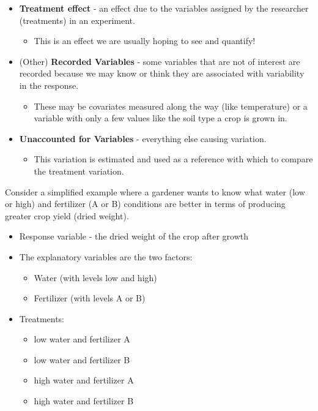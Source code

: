 \documentclass[
]{book}
\providecommand{\tightlist}{%
  \setlength{\itemsep}{0pt}\setlength{\parskip}{0pt}}
\theoremstyle{definition}
\theoremstyle{definition}
\theoremstyle{definition}
\theoremstyle{remark}
\begin{document}
\begin{itemize}
\item
  \textbf{Treatment effect} - an effect due to the variables assigned by the researcher (treatments) in an experiment.

  \begin{itemize}
  \tightlist
  \item
    This is an effect we are usually hoping to see and quantify!
  \end{itemize}
\item
  (Other) \textbf{Recorded Variables} - some variables that are not of interest are recorded because we may know or think they are associated with variability in the response.

  \begin{itemize}
  \tightlist
  \item
    These may be covariates measured along the way (like temperature) or a variable with only a few values like the soil type a crop is grown in.
  \end{itemize}
\item
  \textbf{Unaccounted for Variables} - everything else causing variation.

  \begin{itemize}
  \tightlist
  \item
    This variation is estimated and used as a reference with which to compare the treatment variation.
  \end{itemize}
\end{itemize}

Consider a simplified example where a gardener wants to know what water (low or high) and fertilizer (A or B) conditions are better in terms of producing greater crop yield (dried weight).

\begin{itemize}
\tightlist
\item
  Response variable - the dried weight of the crop after growth
\item
  The explanatory variables are the two factors:

  \begin{itemize}
  \tightlist
  \item
    Water (with levels low and high)\\
  \item
    Fertilizer (with levels A or B)\\
  \end{itemize}
\item
  Treatments:

  \begin{itemize}
  \tightlist
  \item
    low water and fertilizer A\\
  \item
    low water and fertilizer B\\
  \item
    high water and fertilizer A\\
  \item
    high water and fertilizer B
  \end{itemize}
\end{itemize}
\end{document}
